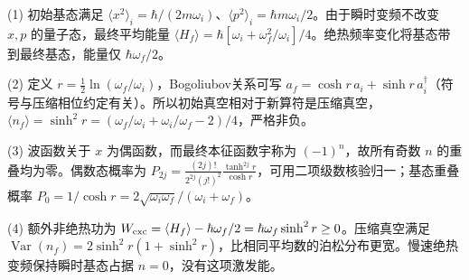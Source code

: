 (1) 初始基态满足 \(\langle x^2\rangle_i=\hbar/(2m\omega_i)\)、\(\langle p^2\rangle_i=\hbar m\omega_i/2\)。由于瞬时变频不改变 \(x,p\) 的量子态，最终平均能量 \(\langle H_f\rangle=\hbar[\omega_i+\omega_f^2/\omega_i]/4\)。绝热频率变化将基态带到最终基态，能量仅 \(\hbar\omega_f/2\)。

(2) 定义 \(r=\tfrac12\ln(\omega_f/\omega_i)\)，Bogoliubov关系可写 \(a_f=\cosh r\,a_i+\sinh r\,a_i^\dagger\)（符号与压缩相位约定有关）。所以初始真空相对于新算符是压缩真空，\(\boxed{\langle n_f\rangle=\sinh^2r=(\omega_f/\omega_i+\omega_i/\omega_f-2)/4}\)，严格非负。

(3) 波函数关于 \(x\) 为偶函数，而最终本征函数宇称为 \((-1)^n\)，故所有奇数 \(n\) 的重叠均为零。偶数态概率为 \(\boxed{P_{2j}=\frac{(2j)!}{2^{2j}(j!)^2}\frac{\tanh^{2j}r}{\cosh r}}\)，可用二项级数核验归一；基态重叠概率 \(P_0=1/\cosh r=2\sqrt{\omega_i\omega_f}/(\omega_i+\omega_f)\)。

(4) 额外非绝热功为 \(W_{\rm exc}=\langle H_f\rangle-\hbar\omega_f/2=\hbar\omega_f\sinh^2r\ge0\)。压缩真空满足 \(\operatorname{Var}(n_f)=2\sinh^2r(1+\sinh^2r)\)，比相同平均数的泊松分布更宽。慢速绝热变频保持瞬时基态占据 \(n=0\)，没有这项激发能。
